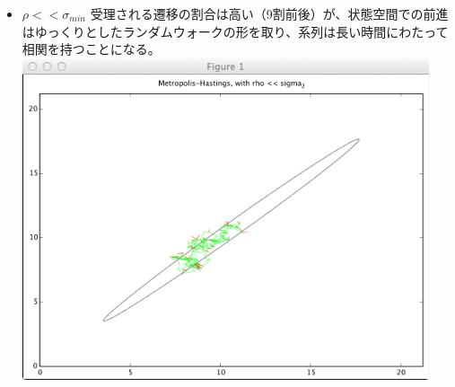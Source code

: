 \documentclass{jsarticle}
\begin{document}
\begin{itemize}
\item $\rho << \sigma_{min}$
受理される遷移の割合は高い（9割前後）が、状態空間での前進はゆっくりとしたランダムウォークの形を取り、系列は長い時間にわたって相関を持つことになる。\\
\includegraphics[width=12cm]{img/mh1.png}


\end{itemize}
\end{document}

